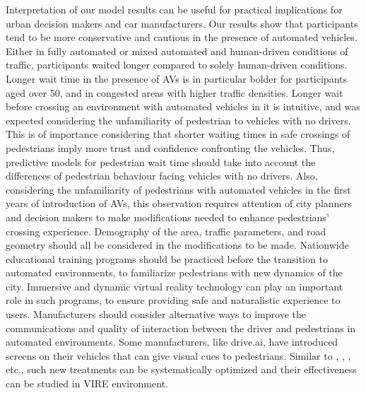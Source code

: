 Interpretation of our model results can be useful for practical implications for urban decision makers and car manufacturers. Our results show that participants tend to be more conservative and cautious in the presence of automated vehicles. Either in fully automated or mixed automated and human-driven conditions of traffic, participants waited longer compared to solely human-driven conditions. Longer wait time in the presence of AVs is in particular bolder for participants aged over 50, and in congested areas with higher traffic densities. Longer wait before crossing an environment with automated vehicles in it is intuitive, and was expected considering the unfamiliarity of pedestrian to vehicles with no drivers. This is of importance considering that shorter waiting times in safe crossings of pedestrians imply more trust and confidence confronting the vehicles. Thus, predictive models for pedestrian wait time should take into account the differences of pedestrian behaviour facing vehicles with no drivers. Also, considering the unfamiliarity of pedestrians with automated vehicles in the first years of introduction of AVs, this observation requires attention of city planners and decision makers to make modifications needed to enhance pedestrians' crossing experience. Demography of the area, traffic parameters, and road geometry should all be considered in the modifications to be made. Nationwide educational training programs should be practiced before the transition to automated environments, to familiarize pedestrians with new dynamics of the city. Immersive and dynamic virtual reality technology can play an important role in such programs, to ensure providing safe and naturalistic experience to users. Manufacturers should consider alternative ways to improve the communications and quality of interaction between the driver and pedestrians in automated environments. Some manufacturers, like drive.ai, have introduced screens on their vehicles that can give visual cues to pedestrians. Similar to \cite{fridman2017walk}, \cite{chang2017eyes}, \cite{de2019external}, etc., such new treatments can be systematically optimized and their effectiveness can be studied in VIRE environment.
